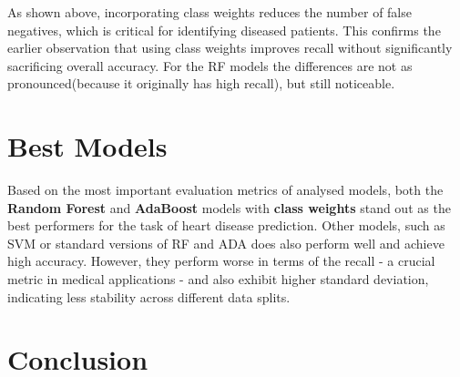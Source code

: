\documentclass[conference]{IEEEtran}
\begin{document}
As shown above, incorporating class weights reduces the number of false negatives, which is critical
for identifying diseased patients. This confirms the earlier observation that using class weights improves recall
without significantly sacrificing overall accuracy. For the RF models the differences are not as pronounced(because
it originally has high recall), but still noticeable.

\section{Best Models}
Based on the most important evaluation metrics of analysed models, both the \textbf{Random Forest}
and \textbf{AdaBoost} models with \textbf{class weights} 
stand out as the best performers for the task of heart disease prediction. 
Other models, such as SVM or standard versions of
RF and ADA does also perform well and achieve high accuracy. However, they perform worse in terms of the recall 
- a crucial metric in medical applications -
and also exhibit higher standard deviation, indicating less stability across different data splits.

\section{Conclusion}
\end{document}
